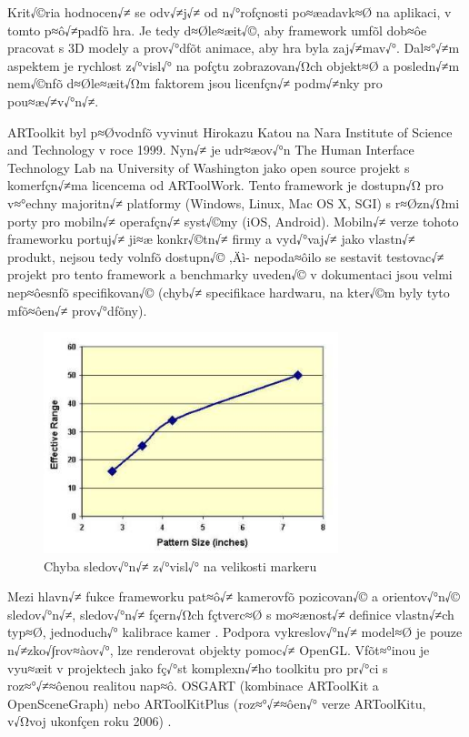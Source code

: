 \documentclass[twoside,12pt]{article}
\begin{document}
% 
\newpage 


Krit√©ria hodnocen√≠ se odv√≠j√≠ od n√°roƒçnosti po≈æadavk≈Ø na aplikaci, v tomto p≈ô√≠padƒõ hra. Je tedy d≈Øle≈æit√©, aby framework umƒõl dob≈ôe pracovat s 3D modely a prov√°dƒõt animace, aby hra byla zaj√≠mav√°. Dal≈°√≠m aspektem je rychlost z√°visl√° na poƒçtu zobrazovan√Ωch objekt≈Ø a posledn√≠m nem√©nƒõ d≈Øle≈æit√Ωm faktorem jsou licenƒçn√≠ podm√≠nky pro pou≈æ√≠v√°n√≠.


ARToolkit byl p≈Øvodnƒõ vyvinut Hirokazu Katou na Nara Institute of Science and Technology v roce 1999. Nyn√≠ je udr≈æov√°n The Human Interface Technology Lab na University of Washington jako open source projekt s komerƒçn√≠ma licencema od ARToolWork. Tento framework je dostupn√Ω pro v≈°echny majoritn√≠ platformy (Windows, Linux, Mac OS X, SGI) s r≈Øzn√Ωmi porty pro mobiln√≠ operaƒçn√≠ syst√©my (iOS, Android). Mobiln√≠ verze tohoto frameworku portuj√≠ ji≈æ konkr√©tn√≠ firmy a vyd√°vaj√≠ jako vlastn√≠ produkt, nejsou tedy volnƒõ dostupn√© ‚Äì- nepoda≈ôilo se sestavit testovac√≠ projekt pro tento framework a benchmarky uveden√© v dokumentaci jsou velmi nep≈ôesnƒõ specifikovan√© (chyb√≠ specifikace hardwaru, na kter√©m byly tyto mƒõ≈ôen√≠ prov√°dƒõny). 

\begin{figure}[H]
    \includegraphics[width=324px, center]{images/artoolkit_benchmark.jpg}
    \caption{Chyba sledov√°n√≠ z√°visl√° na velikosti markeru}
    \label{artoolkit_benchmark}
\end{figure}

Mezi hlavn√≠ fukce frameworku pat≈ô√≠ kamerovƒõ pozicovan√© a orientov√°n√© sledov√°n√≠, sledov√°n√≠ ƒçern√Ωch ƒçtverc≈Ø s mo≈ænost√≠ definice vlastn√≠ch typ≈Ø, jednoduch√° kalibrace kamer \cite{artoolkit_features}. Podpora vykreslov√°n√≠ model≈Ø je pouze n√≠zko√∫rov≈àov√°, lze renderovat objekty pomoc√≠ OpenGL. Vƒõt≈°inou je vyu≈æit v projektech jako ƒç√°st komplexn√≠ho toolkitu pro pr√°ci s roz≈°√≠≈ôenou realitou nap≈ô. OSGART (kombinace ARToolKit a OpenSceneGraph) \cite{osgart} nebo ARToolKitPlus (roz≈°√≠≈ôen√° verze ARToolKitu, v√Ωvoj ukonƒçen roku 2006) \cite{wagner_schmalstieg}. 
\end{document}

